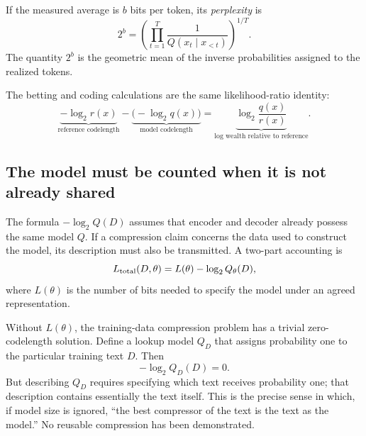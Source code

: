 \documentclass[11pt,twoside]{article}
\theoremstyle{definition}
\theoremstyle{remark}
\begin{document}
If the measured average is $b$ bits per token, its \emph{perplexity} is
\begin{equation}
2^b
=\left(\prod_{t=1}^T\frac{1}{Q(x_t\mid x_{<t})}\right)^{1/T}.
\label{eq:perplexity}
\end{equation}
The quantity $2^b$ is the geometric mean of the inverse probabilities assigned to the
realized tokens.

The betting and coding calculations are the same likelihood-ratio identity:
\begin{equation}
\underbrace{-\log_2 r(x)}_{\text{reference codelength}}
-\underbrace{\bigl(-\log_2 q(x)\bigr)}_{\text{model codelength}}
=\underbrace{\log_2\frac{q(x)}{r(x)}}_{\text{log wealth relative to reference}}.
\label{eq:betting-coding}
\end{equation}

\subsection{The model must be counted when it is not already shared}
\label{sec:model-cost}

The formula $-\log_2Q(D)$ assumes that encoder and decoder already possess the
same model $Q$. If a compression claim concerns the data used to construct the
model, its description must also be transmitted. A two-part accounting is
\begin{equation}
L_{\rm total}(D,\theta)
=L(\theta)-\log_2Q_\theta(D),
\label{eq:two-part-code}
\end{equation}
where $L(\theta)$ is the number of bits needed to specify the model under an
agreed representation.

Without $L(\theta)$, the training-data compression problem has a trivial
zero-codelength solution. Define a lookup model $Q_D$ that assigns probability
one to the particular training text $D$. Then
\begin{equation}
-\log_2Q_D(D)=0.
\label{eq:lookup-zero}
\end{equation}
But describing $Q_D$ requires specifying which text receives probability one;
that description contains essentially the text itself. This is the precise
sense in which, if model size is ignored, ``the best compressor of the text is
the text as the model.'' No reusable compression has been demonstrated.
\end{document}
